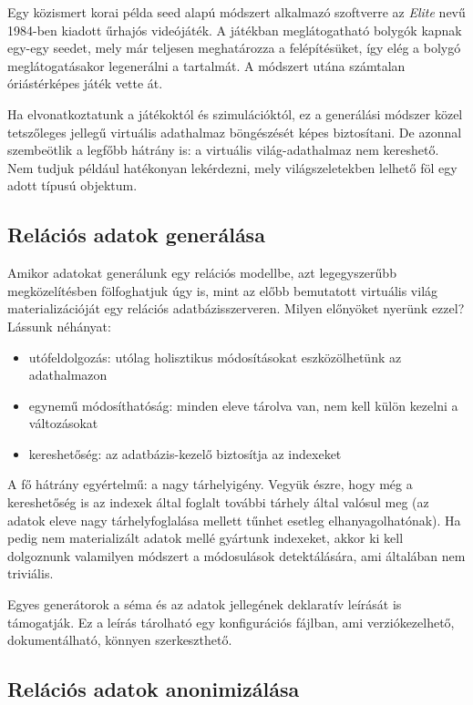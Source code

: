 \documentclass[
    parspace,
    noindent,
    nohyp,
]{elteiktdk}[2023/04/10]
\begin{document}
Egy közismert korai példa seed alapú módszert alkalmazó szoftverre
az \textit{Elite} nevű 1984-ben kiadott űrhajós videójáték.
A játékban meglátogatható bolygók kapnak egy-egy seedet, mely már teljesen meghatározza a felépítésüket,
így elég a bolygó meglátogatásakor legenerálni a tartalmát.
A módszert utána számtalan óriástérképes játék vette át.

Ha elvonatkoztatunk a játékoktól és szimulációktól,
ez a generálási módszer közel tetszőleges jellegű virtuális adathalmaz böngészését képes biztosítani.
De azonnal szembeötlik a legfőbb hátrány is: a virtuális világ-adathalmaz nem kereshető.
Nem tudjuk például hatékonyan lekérdezni, mely világszeletekben lelhető föl egy adott típusú objektum.

\subsection{Relációs adatok generálása}

Amikor adatokat generálunk egy relációs modellbe, azt legegyszerűbb megközelítésben fölfoghatjuk úgy is,
mint az előbb bemutatott virtuális világ materializációját egy relációs adatbázisszerveren.
Milyen előnyöket nyerünk ezzel? Lássunk néhányat:

\begin{itemize}
    \item utófeldolgozás: utólag holisztikus módosításokat eszközölhetünk az adathalmazon
    \item egynemű módosíthatóság: minden eleve tárolva van, nem kell külön kezelni a változásokat
    \item kereshetőség: az adatbázis-kezelő biztosítja az indexeket
\end{itemize}

A fő hátrány egyértelmű: a nagy tárhelyigény.
Vegyük észre, hogy még a kereshetőség is az indexek által foglalt további tárhely által valósul meg
(az adatok eleve nagy tárhelyfoglalása mellett tűnhet esetleg elhanyagolhatónak).
Ha pedig nem materializált adatok mellé gyártunk indexeket,
akkor ki kell dolgoznunk valamilyen módszert a módosulások detektálására, ami általában nem triviális.

Egyes generátorok a séma és az adatok jellegének deklaratív leírását is támogatják. Ez a leírás tárolható egy konfigurációs fájlban, ami verziókezelhető, dokumentálható, könnyen szerkeszthető.

\subsection{Relációs adatok anonimizálása}
\end{document}
